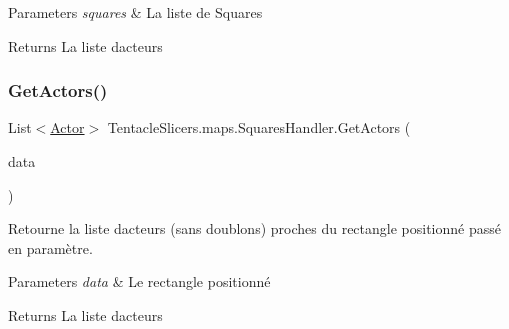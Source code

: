 \begin{DoxyParams}{Parameters}
{\em squares} & La liste de Squares \\
\hline
\end{DoxyParams}
\begin{DoxyReturn}{Returns}
La liste d\textquotesingle{}acteurs 
\end{DoxyReturn}
\mbox{\label{class_tentacle_slicers_1_1maps_1_1_squares_handler_a80e39f9258518ba76d3a8f82ffff0947}} 
\subsubsection{\texorpdfstring{Get\+Actors()}{GetActors()}\hspace{0.1cm}{\footnotesize\ttfamily [2/2]}}
{\footnotesize\ttfamily List$<$\hyperlink{class_tentacle_slicers_1_1actors_1_1_actor}{Actor}$>$ Tentacle\+Slicers.\+maps.\+Squares\+Handler.\+Get\+Actors (\begin{DoxyParamCaption}\item[{\hyperlink{struct_tentacle_slicers_1_1collisions_1_1_shifted_rectangle}{Shifted\+Rectangle}}]{data }\end{DoxyParamCaption})}



Retourne la liste d\textquotesingle{}acteurs (sans doublons) proches du rectangle positionné passé en paramètre. 


\begin{DoxyParams}{Parameters}
{\em data} & Le rectangle positionné \\
\hline
\end{DoxyParams}
\begin{DoxyReturn}{Returns}
La liste d\textquotesingle{}acteurs 
\end{DoxyReturn}
\mbox{\label{class_tentacle_slicers_1_1maps_1_1_squares_handler_a77fb8f2f5483270a7db4b505806e1608}} 
